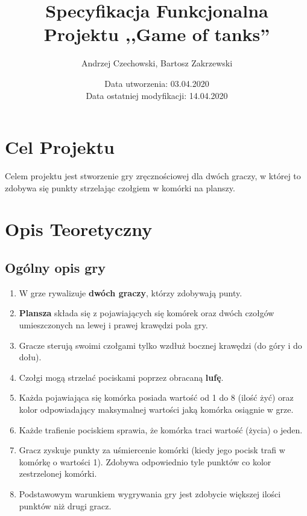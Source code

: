 \documentclass{article}
\title {Specyfikacja Funkcjonalna \\ Projektu ,,Game of tanks''}
\author{Andrzej Czechowski, Bartosz Zakrzewski}
\date{Data utworzenia: 03.04.2020 \\ Data ostatniej modyfikacji: 14.04.2020}
\begin{document}
\maketitle
\thispagestyle{empty}

\clearpage

\section{Cel Projektu}
Celem projektu jest stworzenie gry zręcznościowej dla dwóch graczy, w której to zdobywa się punkty strzelając czołgiem w komórki na planszy. 

\section{Opis Teoretyczny}

\subsection{Ogólny opis gry}
\begin{enumerate}
    \item W grze rywalizuje \textbf{dwóch graczy}, którzy zdobywają punty. 
    
    \item \textbf{Plansza} składa się z pojawiających się komórek oraz dwóch czołgów umieszczonych na lewej i prawej krawędzi pola gry.
    
    \item Gracze sterują swoimi czołgami tylko wzdłuż bocznej krawędzi (do góry i do dołu). 
    
    \item Czołgi mogą strzelać pociskami poprzez obracaną \textbf{lufę}. 
    
    \item Każda pojawiająca się komórka posiada wartość od 1 do 8 (ilość żyć) oraz kolor odpowiadający maksymalnej wartości jaką komórka osiągnie w grze.
    
    \item Każde trafienie pociskiem sprawia, że komórka traci wartość (życia) o jeden.
    
    \item Gracz zyskuje punkty za uśmiercenie komórki (kiedy jego pocisk trafi w komórkę o wartości 1). Zdobywa odpowiednio tyle punktów co kolor zestrzelonej komórki.

    \item Podstawowym warunkiem wygrywania gry jest zdobycie większej ilości punktów niż drugi gracz.
        
\end{enumerate}
\end{document}
